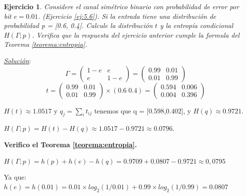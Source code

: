 \documentclass{beamer}
\theoremstyle{plain}
\theoremstyle{example}
\newtheorem{ejercicio} [Ejercicio]{Ejercicio}
\theoremstyle{example}
\begin{document}
\begin{frame}  \small 

\begin{ejercicio} 

Considere el canal simétrico binario con probabilidad de error por bit $e = 0.01$. (Ejercicio  \ref{ej:5.6}). Si la entrada tiene una distribución de probabilidad p = [0.6, 0.4]. Calcule la distribución $t$ y la entropía condicional $H(\Gamma;p)$. Verifica que la respuesta del ejercicio anterior cumple la formula del Teorema \ref{teorema:entropia}.

\end{ejercicio}

\textit{\underline{Solución}}:\\
\[
\Gamma =  \left( \begin{array}{cc}
           1-e       & e      \\
            e    & 1-e      
           \end{array}
    \right) =  \left( \begin{array}{cc}
           0.99       & 0.01     \\
            0.01    & 0.99    
           \end{array}
      \right)      
\]   
\[
     t =    \left( \begin{array}{cc}
           0.99       & 0.01     \\
            0.01    & 0.99    
           \end{array}       
    \right) 
    \times (0.6\; 0.4)
     = \left( \begin{array}{cc}
            0.594     & 0.006     \\
            0.004    & 0.396      
           \end{array}
    \right)
\]


$H(t) \approx 1.0517$ y $q_j = \sum_i t_{ij}$ tenemos que q = [0.598,0.402], y 
$H(q) \approx 0.9721$. 


\begin{center}
$H (\Gamma ; p) = H (t) - H (q) \approx 1.0517 - 0.9721 \approx  0.0796.$
\end{center}

\textbf{Verifico el Teorema \ref{teorema:entropia}.}

\begin{center}
 $H(\Gamma ;p) = h(p)+h(e)-h(q) = 0.9709 + 0.0807 - 0.9721 \approx 0,0795$
\end{center}
Ya que: $ h(e) = h(0.01) = 0.01 \times log_2(1/0.01) + 0.99 \times log_2(1/0.99) =0.0807 $


\end{frame} 
\end{document}
